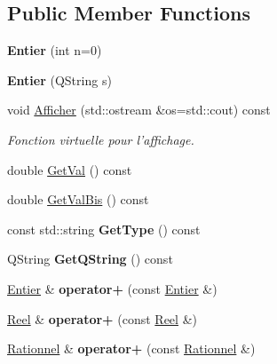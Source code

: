 \subsection*{Public Member Functions}
\begin{DoxyCompactItemize}
\item 
\hypertarget{class_entier_a3c5a9dc84dc805fb47be686f35dca765}{{\bfseries Entier} (int n=0)}\label{class_entier_a3c5a9dc84dc805fb47be686f35dca765}

\item 
\hypertarget{class_entier_a6a50b62869bbefdc15286c05faeaa54f}{{\bfseries Entier} (Q\-String s)}\label{class_entier_a6a50b62869bbefdc15286c05faeaa54f}

\item 
void \hyperlink{class_entier_ab93c84ba0e96feeaf5cbf8bc4fc7c9c3}{Afficher} (std\-::ostream \&os=std\-::cout) const 
\begin{DoxyCompactList}\small\item\em Fonction virtuelle pour l'affichage. \end{DoxyCompactList}\item 
double \hyperlink{class_entier_a3e5f576f451df416bb58e7286ccbe951}{Get\-Val} () const 
\item 
double \hyperlink{class_entier_a349675638599cd6e5f67161664e1d58a}{Get\-Val\-Bis} () const 
\item 
\hypertarget{class_entier_af8701306da8ca2e12869eaa3c65eb03b}{const std\-::string {\bfseries Get\-Type} () const }\label{class_entier_af8701306da8ca2e12869eaa3c65eb03b}

\item 
\hypertarget{class_entier_a6e534c8d7e3861fd43055134f4379262}{Q\-String {\bfseries Get\-Q\-String} () const }\label{class_entier_a6e534c8d7e3861fd43055134f4379262}

\item 
\hypertarget{class_entier_aea9f797a407f40195fe41b0c151b4ad9}{\hyperlink{class_entier}{Entier} \& {\bfseries operator+} (const \hyperlink{class_entier}{Entier} \&)}\label{class_entier_aea9f797a407f40195fe41b0c151b4ad9}

\item 
\hypertarget{class_entier_a6e29bfb969436e9c3bc10a728593532d}{\hyperlink{class_reel}{Reel} \& {\bfseries operator+} (const \hyperlink{class_reel}{Reel} \&)}\label{class_entier_a6e29bfb969436e9c3bc10a728593532d}

\item 
\hypertarget{class_entier_a9a8f4bb64e5eccc82cf445098ef7f4b6}{\hyperlink{class_rationnel}{Rationnel} \& {\bfseries operator+} (const \hyperlink{class_rationnel}{Rationnel} \&)}\label{class_entier_a9a8f4bb64e5eccc82cf445098ef7f4b6}


\end{DoxyCompactItemize}

